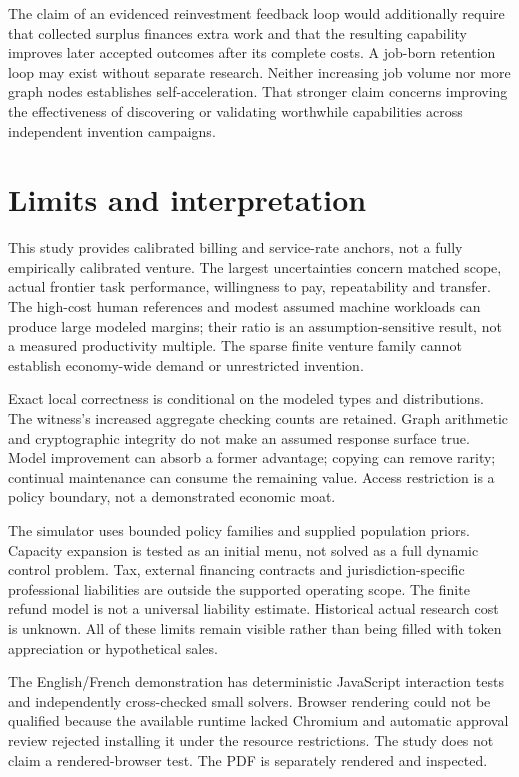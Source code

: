 \documentclass[11pt,letterpaper]{article}
\begin{document}
The claim of an evidenced reinvestment feedback loop would additionally require
that collected surplus finances extra work and that the resulting capability
improves later accepted outcomes after its complete costs. A job-born retention
loop may exist without separate research. Neither increasing job volume nor more
graph nodes establishes self-acceleration. That stronger claim concerns improving
the effectiveness of discovering or validating worthwhile capabilities across
independent invention campaigns.

\section{Limits and interpretation}

This study provides calibrated billing and service-rate anchors, not a fully
empirically calibrated venture. The largest uncertainties concern matched scope,
actual frontier task performance, willingness to pay, repeatability and transfer.
The high-cost human references and modest assumed machine workloads can produce
large modeled margins; their ratio is an assumption-sensitive result, not a
measured productivity multiple. The sparse finite venture family cannot establish
economy-wide demand or unrestricted invention.

Exact local correctness is conditional on the modeled types and distributions.
The witness's increased aggregate checking counts are retained. Graph arithmetic and
cryptographic integrity do not make an assumed response surface true. Model
improvement can absorb a former advantage; copying can remove rarity; continual
maintenance can consume the remaining value. Access restriction is a policy
boundary, not a demonstrated economic moat.

The simulator uses bounded policy families and supplied population priors.
Capacity expansion is tested as an initial menu, not solved as a full dynamic
control problem. Tax, external financing contracts and jurisdiction-specific
professional liabilities are outside the supported operating scope. The finite
refund model is not a universal liability estimate. Historical actual research
cost is unknown. All of these limits remain visible rather than being filled
with token appreciation or hypothetical sales.

The English/French demonstration has deterministic JavaScript interaction tests
and independently cross-checked small solvers. Browser rendering could not be
qualified because the available runtime lacked Chromium and automatic approval
review rejected installing it under the resource restrictions. The study does
not claim a rendered-browser test. The PDF is separately rendered and inspected.
\end{document}
